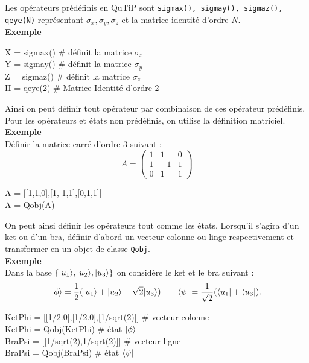 Les opérateurs prédéfinis en QuTiP sont \texttt{sigmax(), sigmay(), sigmaz(), qeye(N)} représentant $\sigma_x,\sigma_y,\sigma_z$ et la matrice identité d'ordre $N$.\\
\textbf{Exemple}\\
\begin{tt}
X = sigmax() \# définit la matrice $\sigma_x$\\
Y = sigmay() \# définit la matrice $\sigma_y$\\
Z = sigmaz() \# définit la matrice $\sigma_z$\\
II = qeye(2) \# Matrice Identité d'ordre 2\\
\end{tt}

Ainsi on peut définir tout opérateur par combinaison de ces opérateur prédéfinis. Pour les opérateurs et états non prédéfinis, on utilise la définition matriciel.\\
\textbf{Exemple}\\
Définir la matrice carré d'ordre 3 suivant :
\begin{equation}
A =
\begin{pmatrix}
1&1&0\\1&-1&1\\0&1&1
\end{pmatrix}
\end{equation}
\begin{tt}
A = [[1,1,0],[1,-1,1],[0,1,1]]\\
A = Qobj(A)
\end{tt}

On peut ainsi définir les opérateurs tout comme les états. Lorsqu'il s'agira d'un ket ou d'un bra, définir d'abord un vecteur colonne ou linge respectivement et transformer en un objet de classe \texttt{Qobj}.\\
\textbf{Exemple}\\
Dans la base $\{\vert u_1\rangle,\vert u_2\rangle,\vert u_3\rangle\}$ on considère le ket et le bra suivant :
\begin{equation}
\vert\phi\rangle=\dfrac{1}{2}(\vert u_1\rangle+\vert u_2\rangle+\sqrt{2}\vert u_3\rangle) \qquad \langle\psi\vert=\dfrac{1}{\sqrt{2}}(\langle u_1\vert+\langle u_3\vert).
\end{equation}
\begin{tt}
KetPhi = [[1/2.0],[1/2.0],[1/sqrt(2)]] \# vecteur colonne \\
KetPhi = Qobj(KetPhi)  \# état $\vert\phi\rangle$ \\
BraPsi = [[1/sqrt(2),1/sqrt(2)]] \# vecteur ligne \\
BraPsi = Qobj(BraPsi) \# état $\langle\psi\vert$ \\
\end{tt}

